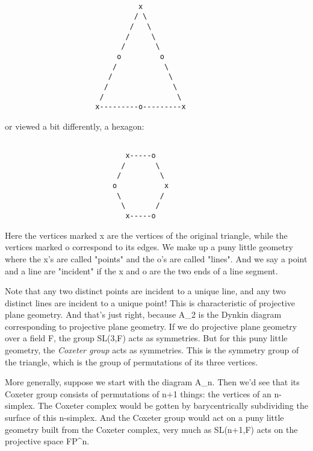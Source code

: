 \begin{verbatim}

                               x
                              / \
                             /   \
                            /     \
                           /       \
                          o         o
                         /           \
                        /             \
                       /               \
                      /                 \
                     x---------o---------x
\end{verbatim}
    
or viewed a bit differently, a hexagon:



\begin{verbatim}

                            x-----o
                           /       \
                          /         \
                         o           x
                          \         /
                           \       /
                            x-----o
\end{verbatim}
    
Here the vertices marked x are the vertices of the original triangle,
while the vertices marked o correspond to its edges.  We make up a puny
little geometry where the x's are called "points" and the o's
are called "lines".  And we say a point and a line are
"incident" if the x and o are the two ends of a line segment.

Note that any two distinct points are incident to a unique line, and 
any two distinct lines are incident to a unique point!  This is
characteristic of projective plane geometry.  And that's just right,
because A_{2} is the Dynkin diagram corresponding to projective plane
geometry.  If we do projective plane geometry over a field F, the group
SL(3,F) acts as symmetries.  But for this puny little geometry, the
\emph{Coxeter group} acts as symmetries.  This is the symmetry group of the
triangle, which is the group of permutations of its three vertices.  
                         
More generally, suppose we start with the diagram A_{n}.  Then
we'd see that its Coxeter group consists of permutations of n+1 things:
the vertices of an n-simplex.  The Coxeter complex would be gotten by
barycentrically subdividing the surface of this n-simplex.  And the
Coxeter group would act on a puny little geometry built from the Coxeter
complex, very much as SL(n+1,F) acts on the projective space
FP^{n}.

